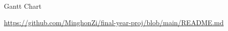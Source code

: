\begin{frame}{Gantt Chart}

\url{https://github.com/MinghonZi/final-year-proj/blob/main/README.md}

\end{frame}
